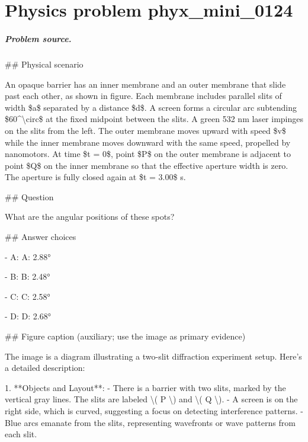 
\chapter{Physics problem phyx\_mini\_0124}
\label{ch:PhyXMiniProblems_problem_phyx_mini_0124}

\paragraph{Problem source.}
\#\# Physical scenario

An opaque barrier has an inner membrane and an outer membrane that slide past each other, as shown in figure. Each membrane includes parallel slits of width \$a\$ separated by a distance \$d\$. A screen forms a circular arc subtending \$60\textasciicircum{}\textbackslash{}circ\$ at the fixed midpoint between the slits. A green 532 nm laser impinges on the slits from the left. The outer membrane moves upward with speed \$v\$ while the inner membrane moves downward with the same speed, propelled by nanomotors. At time \$t = 0\$, point \$P\$ on the outer membrane is adjacent to point \$Q\$ on the inner membrane so that the effective aperture width is zero. The aperture is fully closed again at \$t = 3.00\$ s.

\#\# Question

What are the angular positions of these spots?

\#\# Answer choices

- A: A: 2.88°

- B: B: 2.48°

- C: C: 2.58°

- D: D: 2.68°

\#\# Figure caption (auxiliary; use the image as primary evidence)

The image is a diagram illustrating a two-slit diffraction experiment setup. Here's a detailed description:

1. **Objects and Layout**:
   - There is a barrier with two slits, marked by the vertical gray lines. The slits are labeled \textbackslash{}( P \textbackslash{}) and \textbackslash{}( Q \textbackslash{}).
   - A screen is on the right side, which is curved, suggesting a focus on detecting interference patterns.
   - Blue arcs emanate from the slits, representing wavefronts or wave patterns from each slit.

